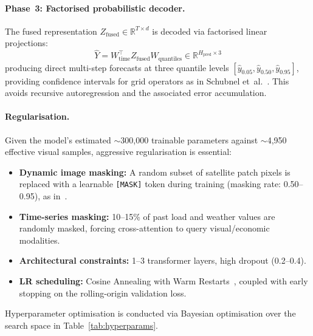 \paragraph{Phase~3: Factorised probabilistic decoder.}
The fused representation $Z_{\text{fused}} \in \mathbb{R}^{T \times d}$ is decoded via factorised linear projections:
\begin{equation}
    \hat{Y} = W_{\text{time}}^\top Z_{\text{fused}} W_{\text{quantiles}} \in \mathbb{R}^{H_{\text{pred}} \times 3}
\end{equation}
producing direct multi-step forecasts at three quantile levels $[\hat{y}_{0.05}, \hat{y}_{0.50}, \hat{y}_{0.95}]$, providing confidence intervals for grid operators as in Schubnel et~al.~\cite{schubnel_solarcrossformer_2025}. This avoids recursive autoregression and the associated error accumulation.

\paragraph{Regularisation.}
Given the model's estimated $\sim$300{,}000 trainable parameters against $\sim$4{,}950 effective visual samples, aggressive regularisation is essential:
\begin{itemize}
    \item \textbf{Dynamic image masking:} A random subset of satellite patch pixels is replaced with a learnable \texttt{[MASK]} token during training (masking rate: 0.50--0.95), as in~\cite{schubnel_solarcrossformer_2025}.
    \item \textbf{Time-series masking:} 10--15\% of past load and weather values are randomly masked, forcing cross-attention to query visual/economic modalities.
    \item \textbf{Architectural constraints:} 1--3 transformer layers, high dropout (0.2--0.4).
    \item \textbf{LR scheduling:} Cosine Annealing with Warm Restarts~\cite{schubnel_solarcrossformer_2025}, coupled with early stopping on the rolling-origin validation loss.
\end{itemize}

Hyperparameter optimisation is conducted via Bayesian optimisation over the search space in Table~\ref{tab:hyperparams}.

